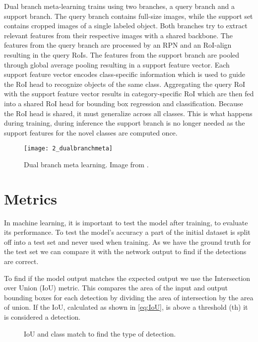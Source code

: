 Dual branch meta-learning trains using two branches, a query branch and a support branch. The query branch contains full-size images, while the support set contains cropped images of a single labeled object. Both branches try to extract relevant features from their respective images with a shared backbone. The features from the query branch are processed by an RPN and an RoI-align resulting in the query RoIs. The features from the support branch are pooled through global average pooling resulting in a support feature vector. Each support feature vector encodes class-specific information which is used to guide the RoI head to recognize objects of the same class. Aggregating the query RoI with the support feature vector results in category-specific RoI which are then fed into a shared RoI head for bounding box regression and classification. Because the RoI head is shared, it must generalize across all classes. This is what happens during training, during inference the support branch is no longer needed as the support features for the novel classes are computed once.

\begin{figure}[h]
	\centering
	\texttt{[image: 2\_dualbranchmeta]}
	\caption{\label{fig:2_dualbranchmeta} Dual branch meta learning. Image from \citet{few-shot-comprehensive-survey}.}
\end{figure}

\section{Metrics}
In machine learning, it is important to test the model after training, to evaluate its performance. To test the model's accuracy a part of the initial dataset is split off into a test set and never used when training. As we have the ground truth for the test set we can compare it with the network output to find if the detections are correct. 

To find if the model output matches the expected output we use the Intersection over Union (IoU) metric. This compares the area of the input and output bounding boxes for each detection by dividing the area of intersection by the area of union. If the IoU, calculated as shown in \ref{eq:IoU}, is above a threshold (th) it is considered a detection.

\begin{figure}[h]
	\centering
	
	\caption{\label{fig:2_IoU_det} IoU and class match to find the type of detection.}
\end{figure}

